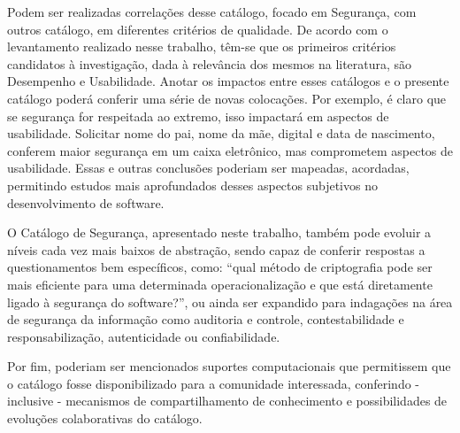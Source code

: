 Podem ser realizadas correlações desse catálogo, focado em Segurança, com outros catálogo, em diferentes critérios de qualidade. De acordo com o levantamento realizado nesse trabalho, têm-se que os primeiros critérios candidatos à investigação, dada à relevância dos mesmos na literatura, são Desempenho e Usabilidade. Anotar os impactos entre esses catálogos e o presente catálogo poderá conferir uma série de novas colocações. Por exemplo, é claro que se segurança for respeitada ao extremo, isso impactará em aspectos de usabilidade. Solicitar nome do pai, nome da mãe, digital e data de nascimento, conferem maior segurança em um caixa eletrônico, mas comprometem aspectos de usabilidade. Essas e outras conclusões poderiam ser mapeadas, acordadas, permitindo estudos mais aprofundados desses aspectos subjetivos no desenvolvimento de software.  

O Catálogo de Segurança, apresentado neste trabalho, também pode evoluir a níveis cada vez mais baixos de abstração, sendo capaz de conferir respostas a questionamentos bem específicos, como: “qual método de criptografia pode ser mais eficiente para uma determinada operacionalização e que está diretamente ligado à segurança do software?”, ou ainda ser expandido para indagações na área de segurança da informação como auditoria e controle, contestabilidade e responsabilização, autenticidade ou confiabilidade.  

Por fim, poderiam ser mencionados suportes computacionais que permitissem que o catálogo fosse disponibilizado para a comunidade interessada, conferindo - inclusive - mecanismos de compartilhamento de conhecimento e possibilidades de evoluções colaborativas do catálogo. 

\begin{comment}
	Prática essa que pode levar a muitos insucessos, tais como o Caso da Ambulância de Londres \cite{finkelstein1996comedy}.
	
	“”
\end{comment}
 


